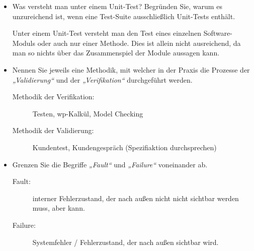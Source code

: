\documentclass{lehramt-informatik-aufgabe}
\begin{document}
\begin{itemize}
%

\item Was versteht man unter einem Unit-Test? Begründen
Sie, warum es unzureichend ist, wenn eine Test-Suite ausschließlich
Unit-Tests enthält.

\begin{antwort}
Unter einem Unit-Test versteht man den Test eines einzelnen
Software-Moduls oder auch nur einer Methode. Dies ist allein nicht
ausreichend, da man so nichts über das Zusammenspiel der Module aussagen
kann.
\end{antwort}

%

\item Nennen Sie jeweils eine Methodik, mit welcher in der Praxis die
Prozesse der \emph{„Validierung“} und der \emph{„Verifikation“}
durchgeführt werden.

\begin{antwort}
\begin{description}
\item[Methodik der Verifikation:]
Testen, wp-Kalkül, Model Checking

\item[Methodik der Validierung:]
Kundentest, Kundengespräch (Spezifiaktion durchsprechen)
\end{description}
\end{antwort}

%

\item Grenzen Sie die Begriffe \emph{„Fault“} und \emph{„Failure“}
voneinander ab.

\begin{antwort}

\begin{description}
\item[Fault:]
interner Fehlerzustand, der nach außen nicht nicht sichtbar werden muss,
aber kann.

\item[Failure:]
Systemfehler / Fehlerzustand, der nach außen sichtbar wird.
\end{description}

\end{antwort}

\end{itemize}
\end{document}
